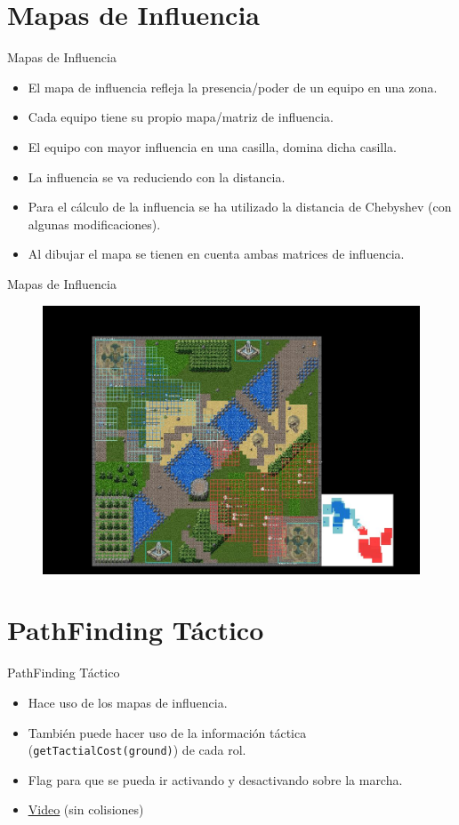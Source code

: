 \documentclass[10pt]{beamer}
\begin{document}
\section{Mapas de Influencia}
\begin{frame}{Mapas de Influencia}
\begin{itemize}[<+- | alert@+>]
	\item El mapa de influencia refleja la presencia/poder de un equipo en una zona.
	\item Cada equipo tiene su propio mapa/matriz de influencia.
	\item El equipo con mayor influencia en una casilla, domina dicha casilla.
	\item La influencia se va reduciendo con la distancia.
	\item Para el cálculo de la influencia se ha utilizado la distancia de Chebyshev (con algunas modificaciones).
	\item Al dibujar el mapa se tienen en cuenta ambas matrices de influencia.
\end{itemize}
\end{frame}

\begin{frame}{Mapas de Influencia}
\begin{figure}[!th]
	\includegraphics[scale=0.4]{images/influencia}
\end{figure}
\end{frame}

\section{PathFinding Táctico}
\begin{frame}{PathFinding Táctico}
\begin{itemize}[<+- | alert@+>]
	\item Hace uso de los mapas de influencia.
	\item También puede hacer uso de la información táctica (\texttt{getTactialCost(ground)}) de cada rol.
	\item Flag para que se pueda ir activando y desactivando sobre la marcha.
	\item \href{videos/TestTacticalPathfinding\_(SIN\_COLISIONES).mp4}{\color{blue}\underline{Video}} (sin colisiones)
\end{itemize}
\end{frame}
\end{document}
